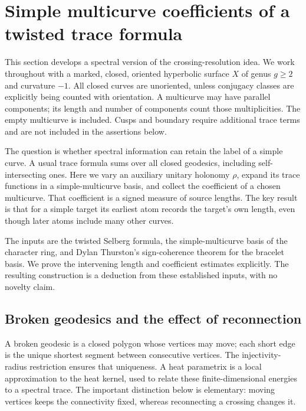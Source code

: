 \section{Simple multicurve coefficients of a twisted trace formula}
\label{sec:coefficientdistributions}

This section develops a spectral version of the crossing-resolution
idea. We work throughout with a marked, closed, oriented hyperbolic
surface $X$ of genus $g\geq2$ and curvature $-1$. All closed curves
are unoriented, unless conjugacy classes are explicitly being counted
with orientation. A multicurve may have parallel components; its
length and number of components count those multiplicities. The
empty multicurve is included. Cusps and boundary require additional
trace terms and are not included in the assertions below.

The question is whether spectral information can retain the label
of a simple curve. A usual trace formula sums over all closed
geodesics, including self-intersecting ones. Here we vary an auxiliary
unitary holonomy $\rho$, expand its trace functions in a simple-multicurve
basis, and collect the coefficient of a chosen multicurve. That
coefficient is a signed measure of source lengths. The key result
is that for a simple target its earliest atom records the target's
own length, even though later atoms include many other curves.

The inputs are the twisted Selberg formula, the simple-multicurve
basis of the character ring, and Dylan Thurston's sign-coherence
theorem for the bracelet basis. We prove the intervening length and
coefficient estimates explicitly. The resulting construction is a
deduction from these established inputs, with no novelty claim.

\subsection{Broken geodesics and the effect of reconnection}

A broken geodesic is a closed polygon whose vertices may move;
each short edge is the unique shortest segment between consecutive
vertices. The injectivity-radius restriction ensures that uniqueness.
A heat parametrix is a local approximation to the heat kernel,
used to relate these finite-dimensional energies to a spectral trace.
The important distinction below is elementary: moving vertices keeps
the connectivity fixed, whereas reconnecting a crossing changes it.

